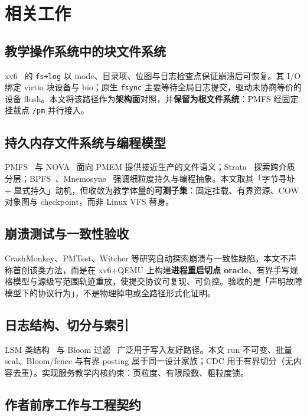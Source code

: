 \chapter{相关工作}
\label{chap:related}

\section{教学操作系统中的块文件系统}

xv6~\cite{xv6book} 的 \texttt{fs+log} 以 inode、目录项、位图与日志检查点保证崩溃后可恢复。其 I/O 绑定 virtio 块设备与 bio；原生 \texttt{fsync} 主要等待全局日志提交，驱动未协商等价的设备 flush。本文将该路径作为\textbf{架构面}对照，并\textbf{保留为根文件系统}：PMFS 经固定挂载点 \texttt{/pm} 并行接入。

\section{持久内存文件系统与编程模型}

PMFS~\cite{pmfs2014} 与 NOVA~\cite{nova2016} 面向 PMEM 提供接近生产的文件语义；Strata~\cite{strata2017} 探索跨介质分层；BPFS~\cite{bpfs2009}、Mnemosyne~\cite{mnemosyne2011} 强调细粒度持久与编程抽象。本文取其「字节寻址 + 显式持久」动机，但收敛为教学体量的\textbf{可测子集}：固定挂载、有界资源、COW 对象图与 checkpoint，而非 Linux VFS 替身。

\section{崩溃测试与一致性验收}

CrashMonkey、PMTest、Witcher 等研究自动探索崩溃与一致性缺陷。本文不声称首创该类方法，而是在 xv6+QEMU 上构建\textbf{进程重启切点 oracle}、有界手写规格模型与源级写范围轨迹重放，使提交协议可复现、可负控。验收的是「声明故障模型下的协议行为」，不是物理掉电或全路径形式化证明。

\section{日志结构、切分与索引}

LSM 类结构~\cite{blsm2012} 与 Bloom 过滤~\cite{bloom1970} 广泛用于写入友好路径。本文 run 不可变、批量 seal、Bloom/fence 与有界 posting 属于同一设计家族；CDC 用于有界切分（无内容去重）。实现服务教学内核约束：页粒度、有限段数、粗粒度锁。

\section{作者前序工作与工程契约}

